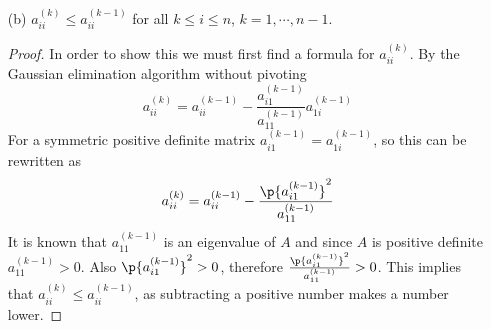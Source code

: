 \documentclass[11pt]{article}
\begin{document}
\begin{enumerate}
\begin{enumerate}
\begin{proof}
                    Next I will prove that $A_{22}^{(k)}$ is positive definite.
                    Assume to the contradiction that $A_{22}^{(k)}$ is not
                    positive definite.
                    This implies that there exists a vector $\v{x}$ such that
                    $\v{x}^T A_{22}^{(k)} \v{x} \le 0$.
                    Construct $\v{y}$ such that $\v{y} \in \RR^m$ and the last
                    entries are $\v{x}$ and the first entries are $0$.
                    In this case because Gaussian elimination doesn't affect the
                    determinant
                    \begin{align*}
                        \v{y}^T A \v{y} &= \v{y}^T
                        \begin{bmatrix}
                            A_{11}^{(k)} & A_{12}^{(k)} \\
                            0            & A_{22}^{(k)}
                        \end{bmatrix}
                        \v{y} \\
                        &= \v{x}^T A_{22}^{(k)} \v{x} \\
                        &\le 0
                    \end{align*}
                    This contradicts the fact that $A$ is positive definite, therefore
                    $A_{22}^{(k)}$ must be positive definite for all $k$.
                \end{proof}

            \item[(b)] %
                $a_{ii}^{(k)} \le a_{ii}^{(k-1)}$ for all $k \le i \le n$,
                $k = 1, \cdots, n - 1$.

                \begin{proof}
                    In order to show this we must first find a formula for
                    $a_{ii}^{(k)}$.
                    By the Gaussian elimination algorithm without pivoting
                    \[
                        a_{ii}^{(k)} = a_{ii}^{(k-1)} - \frac{a_{i1}^{(k-1)}}{a_{11}^{(k-1)}} a_{1i}^{(k-1)}
                    \]
                    For a symmetric positive definite matrix
                    $a_{i1}^{(k-1)} = a_{1i}^{(k-1)}$, so this can be rewritten as
                    \[
                        a_{ii}^{(k)} = a_{ii}^{(k-1)} - \frac{\p{a_{i1}^{(k-1)}}^2}{a_{11}^{(k-1)}}
                    \]
                    It is known that $a_{11}^{(k-1)}$ is an eigenvalue of $A$ and since $A$ is positive definite
                    $a_{11}^{(k-1)} > 0$.
                    Also $\p{a_{i1}^{(k-1)}}^2 > 0$, therefore $\frac{\p{a_{i1}^{(k-1)}}^2}{a_{11}^{(k-1)}} > 0$.
                    This implies that $a_{ii}^{(k)} \le a_{ii}^{(k-1)}$, as subtracting a positive number makes
                    a number lower.
                \end{proof}
        \end{enumerate}


\end{enumerate}
\end{document}
